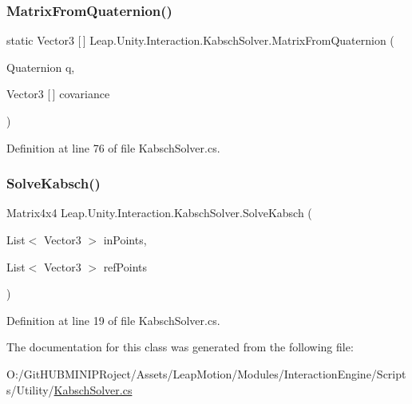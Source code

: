 \subsubsection{\texorpdfstring{MatrixFromQuaternion()}{MatrixFromQuaternion()}}
{\footnotesize\ttfamily static Vector3 \mbox{[}$\,$\mbox{]} Leap.\+Unity.\+Interaction.\+Kabsch\+Solver.\+Matrix\+From\+Quaternion (\begin{DoxyParamCaption}\item[{Quaternion}]{q,  }\item[{Vector3 \mbox{[}$\,$\mbox{]}}]{covariance }\end{DoxyParamCaption})\hspace{0.3cm}{\ttfamily [static]}}



Definition at line 76 of file Kabsch\+Solver.\+cs.

\mbox{\label{class_leap_1_1_unity_1_1_interaction_1_1_kabsch_solver_a6aac06a0dcbe2e7ac0a53b43b64bdcaf}} 
\subsubsection{\texorpdfstring{SolveKabsch()}{SolveKabsch()}}
{\footnotesize\ttfamily Matrix4x4 Leap.\+Unity.\+Interaction.\+Kabsch\+Solver.\+Solve\+Kabsch (\begin{DoxyParamCaption}\item[{List$<$ Vector3 $>$}]{in\+Points,  }\item[{List$<$ Vector3 $>$}]{ref\+Points }\end{DoxyParamCaption})}



Definition at line 19 of file Kabsch\+Solver.\+cs.



The documentation for this class was generated from the following file\+:\begin{DoxyCompactItemize}
\item 
O\+:/\+Git\+H\+U\+B\+M\+I\+N\+I\+P\+Roject/\+Assets/\+Leap\+Motion/\+Modules/\+Interaction\+Engine/\+Scripts/\+Utility/\mbox{\hyperlink{_kabsch_solver_8cs}{Kabsch\+Solver.\+cs}}\end{DoxyCompactItemize}
